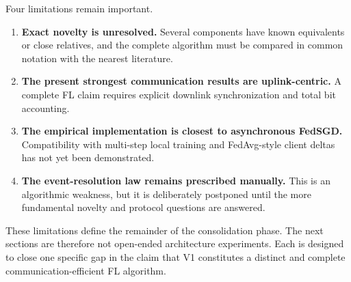 Four limitations remain important.
\begin{enumerate}
    \item \textbf{Exact novelty is unresolved.} Several components have known equivalents or close relatives, and the complete algorithm must be compared in common notation with the nearest literature.
    \item \textbf{The present strongest communication results are uplink-centric.} A complete FL claim requires explicit downlink synchronization and total bit accounting.
    \item \textbf{The empirical implementation is closest to asynchronous FedSGD.} Compatibility with multi-step local training and FedAvg-style client deltas has not yet been demonstrated.
    \item \textbf{The event-resolution law remains prescribed manually.} This is an algorithmic weakness, but it is deliberately postponed until the more fundamental novelty and protocol questions are answered.
\end{enumerate}

These limitations define the remainder of the consolidation phase. The next sections are therefore not open-ended architecture experiments. Each is designed to close one specific gap in the claim that V1 constitutes a distinct and complete communication-efficient FL algorithm.
